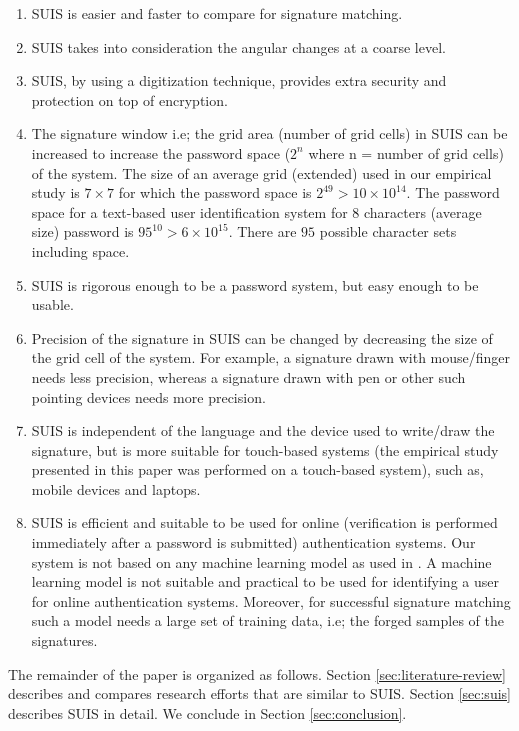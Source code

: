 \documentclass[conference]{IEEEtran}
\begin{document}
\begin{enumerate}
\item
SUIS is easier and faster to compare for signature matching.
\item
SUIS takes into consideration the angular changes at a coarse level.
\item
SUIS, by using a digitization technique, provides extra security and protection on top of encryption.
\item
The signature window i.e; the grid area (number of grid cells) in SUIS can be increased to increase the password space ($2^n$ where n = number of grid cells) of the system. The size of an average grid (extended) used in our empirical study is $7 \times 7$ for which the password space is $2^{49} > 10 \times 10^{14}$. The password space for a text-based user identification system for $8$ characters (average size) password is $95^{10} > 6 \times 10^{15}$. There are $95$ possible character sets including space.
\item
SUIS is rigorous enough to be a password system, but easy enough to be usable.
\item
Precision of the signature in SUIS can be changed by decreasing the size of the grid cell of the system. For example, a signature drawn with mouse/finger needs less precision, whereas a signature drawn with pen or other such pointing devices needs more precision.
\item
SUIS is independent of the language and the device used to write/draw the signature, but is more suitable for touch-based systems (the empirical study presented in this paper was performed on a touch-based system), such as, mobile devices and laptops.
\item
SUIS is efficient and suitable to be used for online (verification is performed immediately after a password is submitted) authentication systems. Our system is not based on any machine learning model as used in \cite{java-gp}. A machine learning model is not suitable and practical to be used for identifying a user for online authentication systems. Moreover, for successful signature matching such a model needs a large set of training data, i.e; the forged samples of the signatures.
\end{enumerate}

The remainder of the paper is organized as follows. Section \ref{sec:literature-review} describes and compares research efforts that are similar to SUIS. Section \ref{sec:suis} describes SUIS in detail. We conclude in Section \ref{sec:conclusion}.
\end{document}
